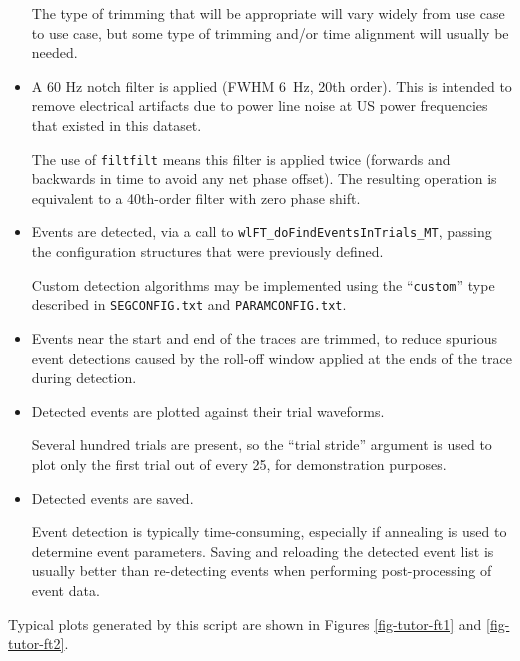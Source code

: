 \begin{itemize}
The type of trimming that will be appropriate will vary widely from use case
to use case, but some type of trimming and/or time alignment will usually be
needed.
%
\item A 60 Hz notch filter is applied (FWHM 6~Hz, 20th order). This is
intended to remove electrical artifacts due to power line noise at US power
frequencies that existed in this dataset.

The use of \texttt{filtfilt} means this filter is applied twice (forwards and
backwards in time to avoid any net phase offset). The resulting operation
is equivalent to a 40th-order filter with zero phase shift.
%
\item Events are detected, via a call to
\texttt{wlFT\_doFindEventsInTrials\_MT}, passing the configuration structures
that were previously defined.

Custom detection algorithms may be implemented using the ``\texttt{custom}''
type described in \texttt{SEGCONFIG.txt} and \texttt{PARAMCONFIG.txt}.
%
\item Events near the start and end of the traces are trimmed, to reduce
spurious event detections caused by the roll-off window applied at the ends
of the trace during detection.
%
\item Detected events are plotted against their trial waveforms.

Several hundred trials are present, so the ``trial stride'' argument is used
to plot only the first trial out of every 25, for demonstration purposes.
%
\item Detected events are saved.

Event detection is typically time-consuming, especially if annealing is
used to determine event parameters. Saving and reloading the detected
event list is usually better than re-detecting events when performing
post-processing of event data.
%
\end{itemize}

Typical plots generated by this script are shown in Figures
\ref{fig-tutor-ft1} and \ref{fig-tutor-ft2}.

\vspace*{2in}

